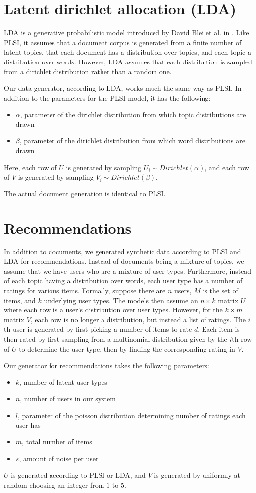 \documentclass[11pt]{article}
\theoremstyle{definition}
\begin{document}
\section{Latent dirichlet allocation (LDA)}
LDA is a generative probabilistic model introduced by David Blei et al. in \cite{?}. Like PLSI, it assumes that a document corpus is generated from a finite number of latent topics, that each document has a distribution over topics, and each topic a distribution over words. However, LDA assumes that each distribution is sampled from a dirichlet distribution rather than a random one. 

Our data generator, according to LDA, works much the same way as PLSI. In addition to the parameters for the PLSI model, it has the following:
\begin{itemize}
	\item $\alpha$, parameter of the dirichlet distribution from which topic distributions are drawn
	\item $\beta$, parameter of the dirichlet distribution from which word distributions are drawn
\end{itemize}
Here, each row of $U$ is generated by sampling $U_i \sim Dirichlet(\alpha)$, and each row of $V$ is generated by sampling $V_i \sim Dirichlet(\beta)$.

The actual document generation is identical to PLSI.

\section{Recommendations}
In addition to documents, we generated synthetic data according to PLSI and LDA for recommendations. Instead of documents being a mixture of topics, we assume that we have users who are a mixture of user types. Furthermore, instead of each topic having a distribution over words, each user type has a number of ratings for various items. Formally, suppose there are $n$ users, $M$ is the set of items, and $k$ underlying user types. The models then assume an $n\times k$ matrix $U$ where each row is a user's distribution over user types. However, for the $k\times m$ matrix $V$, each row is no longer a distribution, but instead a list of ratings. The $i$th user is generated by first picking a number of items to rate $d$. Each item is then rated by first sampling from a multinomial distribution given by the $i$th row of $U$ to determine the user type, then by finding the corresponding rating in $V$.

Our generator for recommendations takes the following parameters:
\begin{itemize}
	\item $k$, number of latent user types
	\item $n$, number of users in our system
	\item $l$, parameter of the poisson distribution determining number of ratings each user has
	\item $m$, total number of items
	\item $s$, amount of noise per user
\end{itemize}
$U$ is generated according to PLSI or LDA, and $V$ is generated by uniformly at random choosing an integer from $1$ to $5$.
\end{document}
